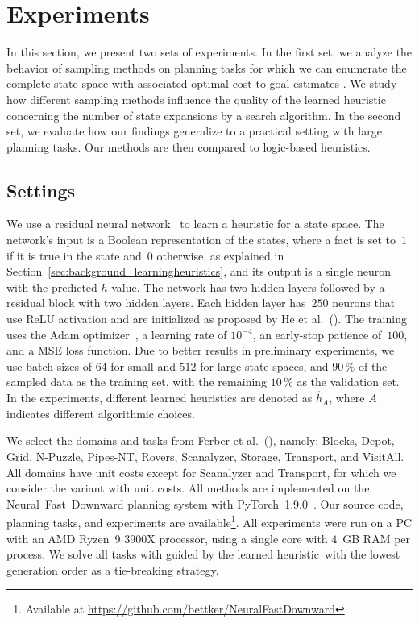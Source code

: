 \chapter{Experiments}
\label{sec:experiments}

In this section, we present two sets of experiments. In the first set, we analyze the behavior of sampling methods on planning tasks for which we can enumerate the complete state space with associated optimal cost-to-goal estimates \hstar. We study how different sampling methods influence the quality of the learned heuristic concerning the number of state expansions by a search algorithm. In the second set, we evaluate how our findings generalize to a practical setting with large planning tasks. Our methods are then compared to logic-based heuristics.

\section{Settings}
\label{sec:exp_settings}

We use a residual neural network~\cite{He.etal/2016} to learn a heuristic for a state space. The network's input is a Boolean representation of the states, where a fact is set to~$1$ if it is true in the state and~$0$ otherwise, as explained in Section~\ref{sec:background_learningheuristics}, and its output is a single neuron with the predicted $h$-value. The network has two hidden layers followed by a residual block with two hidden layers. Each hidden layer has~$250$ neurons that use ReLU activation and are initialized as proposed by He et al.~(\citeyear{He.etal/2015}). The training uses the Adam optimizer~\cite{Kingma.Ba/2015}, a learning rate of $10^{-4}$, an early-stop patience of~$100$, and a MSE loss function. Due to better results in preliminary experiments, we use batch sizes of $64$ for small and $512$ for large state spaces, and $90\,\%$ of the sampled data as the training set, with the remaining $10\,\%$ as the validation set. In the experiments, different learned heuristics are denoted as $\hat h_A$, where $A$ indicates different algorithmic choices.

We select the domains and tasks from Ferber et al.~(\citeyear{Ferber.etal/2022}), namely: Blocks, Depot, Grid, N-Puzzle, Pipes-NT, Rovers, Scanalyzer, Storage, Transport, and VisitAll. All domains have unit costs except for Scanalyzer and Transport, for which we consider the variant with unit costs. All methods are implemented on the Neural~Fast~Downward planning system with PyTorch~1.9.0~\cite{Ferber.etal/2020a,Paszke/2019}. Our source code, planning tasks, and experiments are available\footnote{Available at \url{https://github.com/bettker/NeuralFastDownward}}. All experiments were run on a PC with an AMD Ryzen~9 3900X processor, using a single core with $4$~GB RAM per process. We solve all tasks with \gbfs guided by the learned heuristic~\hnn with the lowest generation order as a tie-breaking strategy.

